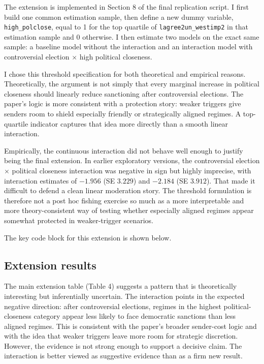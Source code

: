 \documentclass[12pt,letterpaper]{article}
\begin{document}
	The extension is implemented in Section 8 of the final replication script. I first build one common estimation sample, then define a new dummy variable, \texttt{high\_polclose}, equal to 1 for the top quartile of \texttt{lagree2un\_westimp2} in that estimation sample and 0 otherwise. I then estimate two models on the exact same sample: a baseline model without the interaction and an interaction model with controversial election $\times$ high political closeness.
	
	I chose this threshold specification for both theoretical and empirical reasons. Theoretically, the argument is not simply that every marginal increase in political closeness should linearly reduce sanctioning after controversial elections. The paper's logic is more consistent with a protection story: weaker triggers give senders room to shield especially friendly or strategically aligned regimes. A top-quartile indicator captures that idea more directly than a smooth linear interaction.
	
	Empirically, the continuous interaction did not behave well enough to justify being the final extension. In earlier exploratory versions, the controversial election $\times$ political closeness interaction was negative in sign but highly imprecise, with interaction estimates of $-1.956$ (SE $3.229$) and $-2.184$ (SE $3.912$). That made it difficult to defend a clean linear moderation story. The threshold formulation is therefore not a post hoc fishing exercise so much as a more interpretable and more theory-consistent way of testing whether especially aligned regimes appear somewhat protected in weaker-trigger scenarios.
	
	The key code block for this extension is shown below.
	
	
	
	\subsection*{Extension results}
	
	
	
	The main extension table (Table 4) suggests a pattern that is theoretically interesting but inferentially uncertain. The interaction points in the expected negative direction: after controversial elections, regimes in the highest political-closeness category appear less likely to face democratic sanctions than less aligned regimes. This is consistent with the paper's broader sender-cost logic and with the idea that weaker triggers leave more room for strategic discretion. However, the evidence is not strong enough to support a decisive claim. The interaction is better viewed as suggestive evidence than as a firm new result.
	
\end{document}

